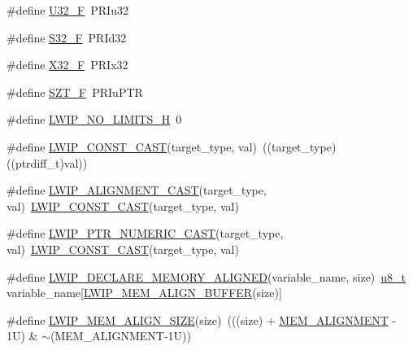 \begin{DoxyCompactItemize}
\#define \hyperlink{group__compiler__abstraction_gad8b0a364e95b07cb0c47709fdc6037d6}{U32\+\_\+F}~P\+R\+Iu32
\item 
\#define \hyperlink{group__compiler__abstraction_ga4b1eca99bc81e248c7074ea87fc9ca63}{S32\+\_\+F}~P\+R\+Id32
\item 
\#define \hyperlink{group__compiler__abstraction_gac219830a93d05c5f18f64ce87a34be14}{X32\+\_\+F}~P\+R\+Ix32
\item 
\#define \hyperlink{group__compiler__abstraction_ga4cd359b6110f318ef71814587e1df029}{S\+Z\+T\+\_\+F}~P\+R\+Iu\+P\+TR
\item 
\#define \hyperlink{group__compiler__abstraction_gade9c8513419a799cd78a07ae894bb805}{L\+W\+I\+P\+\_\+\+N\+O\+\_\+\+L\+I\+M\+I\+T\+S\+\_\+H}~0
\item 
\#define \hyperlink{group__compiler__abstraction_gaa0dd3f76dd9a837feaac61fedc0dbe72}{L\+W\+I\+P\+\_\+\+C\+O\+N\+S\+T\+\_\+\+C\+A\+ST}(target\+\_\+type,  val)~((target\+\_\+type)((ptrdiff\+\_\+t)val))
\item 
\#define \hyperlink{group__compiler__abstraction_gaade87973d72135b0b3afccfff4f62eb8}{L\+W\+I\+P\+\_\+\+A\+L\+I\+G\+N\+M\+E\+N\+T\+\_\+\+C\+A\+ST}(target\+\_\+type,  val)~\hyperlink{group__compiler__abstraction_gaa0dd3f76dd9a837feaac61fedc0dbe72}{L\+W\+I\+P\+\_\+\+C\+O\+N\+S\+T\+\_\+\+C\+A\+ST}(target\+\_\+type, val)
\item 
\#define \hyperlink{group__compiler__abstraction_ga683e5c35d3263fe3145e6a6bc546604a}{L\+W\+I\+P\+\_\+\+P\+T\+R\+\_\+\+N\+U\+M\+E\+R\+I\+C\+\_\+\+C\+A\+ST}(target\+\_\+type,  val)~\hyperlink{group__compiler__abstraction_gaa0dd3f76dd9a837feaac61fedc0dbe72}{L\+W\+I\+P\+\_\+\+C\+O\+N\+S\+T\+\_\+\+C\+A\+ST}(target\+\_\+type, val)
\item 
\#define \hyperlink{group__compiler__abstraction_ga651bb349041669fe717b19f127ef16c0}{L\+W\+I\+P\+\_\+\+D\+E\+C\+L\+A\+R\+E\+\_\+\+M\+E\+M\+O\+R\+Y\+\_\+\+A\+L\+I\+G\+N\+ED}(variable\+\_\+name,  size)~\hyperlink{group__compiler__abstraction_ga4caecabca98b43919dd11be1c0d4cd8e}{u8\+\_\+t} variable\+\_\+name\mbox{[}\hyperlink{group__compiler__abstraction_ga25591dcb72fccc7b5dc46fbc1959694e}{L\+W\+I\+P\+\_\+\+M\+E\+M\+\_\+\+A\+L\+I\+G\+N\+\_\+\+B\+U\+F\+F\+ER}(size)\mbox{]}
\item 
\#define \hyperlink{group__compiler__abstraction_gaef204be511fd32f681b55abc08e9ae18}{L\+W\+I\+P\+\_\+\+M\+E\+M\+\_\+\+A\+L\+I\+G\+N\+\_\+\+S\+I\+ZE}(size)~(((size) + \hyperlink{group__lwip__opts__mem_ga97343214666ee6dcb18c0bd77b441ea7}{M\+E\+M\+\_\+\+A\+L\+I\+G\+N\+M\+E\+NT} -\/ 1\+U) \& $\sim$(\+M\+E\+M\+\_\+\+A\+L\+I\+G\+N\+M\+E\+N\+T-\/1\+U))

\end{DoxyCompactItemize}
